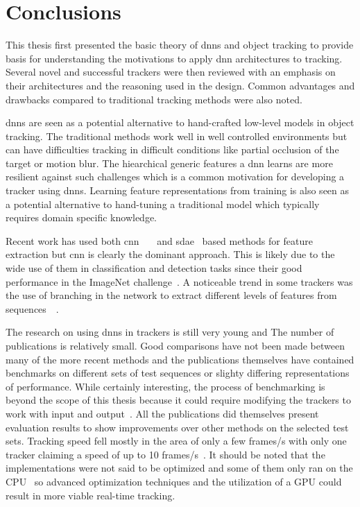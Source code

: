 \section{Conclusions}

This thesis first presented the basic theory of \ac{dnn}s and object tracking to
provide basis for understanding the motivations to apply \ac{dnn} architectures
to tracking. Several novel and successful trackers were then reviewed with an emphasis
on their architectures and the reasoning used in the design. Common advantages and
drawbacks compared to traditional tracking methods were also noted.

\ac{dnn}s are seen as a potential alternative to hand-crafted low-level models in
object tracking. The traditional methods work well in well controlled environments
but can have difficulties tracking in difficult conditions like partial occlusion
of the target or motion blur. The hiearchical generic features a \ac{dnn} learns
are more resilient against such challenges which is a common motivation for developing
a tracker using \ac{dnn}s. Learning feature representations from training is also seen
as a potential alternative to hand-tuning a traditional model which typically requires
domain specific knowledge.~\cite{DLT}

Recent work has used both \ac{cnn}~\cite{DEEPTRACK}~\cite{MDNET}~\cite{VGG} and
\ac{sdae}~\cite{BLUR_TRACK} based methods for feature extraction but \ac{cnn} is
clearly the dominant approach. This is likely due to the wide use of them in classification
and detection tasks since their good performance in the ImageNet challenge~\cite{NIPS_IMAGENET}.
A noticeable trend in some trackers was the use of branching in the network to extract
different levels of features from sequences~\cite{MDNET}~\cite{FCN_TRACK_2}.

The research on using \ac{dnn}s in trackers is still very young and The number of
publications is relatively small. Good comparisons have not been made between many
of the more recent methods and the publications themselves have contained benchmarks
on different sets of test sequences or slighty differing representations of performance.
While certainly interesting, the process of benchmarking is beyond the scope of this
thesis because it could require modifying the trackers to work with input and output~\cite{OT_BENCH}.
All the publications did themselves present evaluation results to show improvements
over other methods on the selected test sets. Tracking speed fell mostly in the area
of only a few frames/s with only one tracker claiming a speed of up to 10 frames/s~\cite{BLUR_TRACK}.
It should be noted that the implementations were not said to be optimized and some of
them only ran on the CPU~\cite{LEARNED_HIERARCH} so advanced optimization techniques and
the utilization of a GPU could result in more viable real-time tracking.

